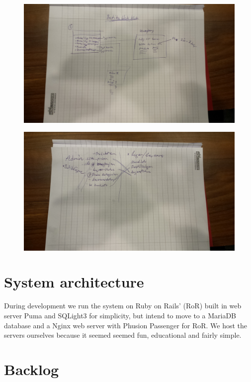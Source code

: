 \documentclass[paper=a4, fontsize=11pt]{report} %
\begin{document}
	\begin{figure}
		\includegraphics[scale=0.12]{artifacts/ButiksAdmin.jpeg}
		\caption{}
		\label{fig:3}
	\end{figure}

	\begin{figure}
		\includegraphics[scale=0.12]{artifacts/Admin.jpeg}
		\caption{}
		\label{fig:4}
	\end{figure}

\section*{System architecture}
	During development we run the system on Ruby on Rails' (RoR) built in web server
	Puma and SQLight3 for simplicity, but intend to move to a MariaDB database
	and a Nginx web server with Phusion Passenger for RoR. We host
	the servers ourselves because it seemed seemed fun, educational and fairly simple.

\section*{Backlog}
\end{document}
